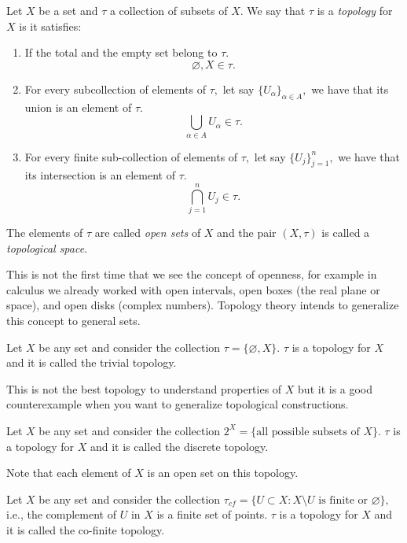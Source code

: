 \documentclass[
	fontsize=10pt, %
	twoside=false, %
	secnumdepth=1, %
]{kaobook}
\begin{document}
\begin{definition}
Let $X$ be a set and $\tau$ a collection of subsets of $X.$ We say that $\tau$ is a \emph{topology} for $X$ is it satisfies:
\begin{enumerate}
\item If the total and the empty set belong to $\tau.$ $$\varnothing, X\in\tau.$$

\item For every subcollection of elements of $\tau,$ let say $\{U_\alpha\}_{\alpha\in A},$ we have that its union is an element of $\tau.$ $$\bigcup_{\alpha \in A} U_\alpha \in \tau.$$

\item For every finite sub-collection of elements of $\tau,$ let say $\{U_j\}_{j=1}^n,$ we have that its intersection is an element of $\tau.$ $$ \bigcap_{j=1}^n U_j\in\tau.$$
\end{enumerate}

The elements of $\tau$ are called \emph{open sets} of $X$ and the pair $(X,\tau)$ is called a \emph{topological space}.
\end{definition}

This is not the first time that we see the concept of openness, for example in calculus we already worked with open intervals, open boxes (the real plane or space), and open disks (complex numbers). Topology theory intends to generalize this concept to general sets.

\begin{example}
Let $X$ be any set and consider the collection $\tau=\{\varnothing, X\}.$ $\tau$ is a topology for $X$ and it is called the trivial topology. 

This is not the best topology to understand properties of $X$ but it is a good counterexample when you want to generalize topological constructions.
\end{example}

\begin{example}
Let $X$ be any set and consider the collection $2^X=\{\mbox{all possible subsets of } X\}.$ $\tau$ is a topology for $X$ and it is called the discrete topology. 

Note that each element of $X$ is an open set on this topology. 
\end{example}

\begin{example}
Let $X$ be any set and consider the collection $\tau_{cf}=\{U\subset X: X\setminus U \mbox{ is finite or }\varnothing\},$ i.e., the complement of $U$ in $X$ is a finite set of points. $\tau$ is a topology for $X$ and it is called the co-finite topology. 
\end{example}
\end{document}

